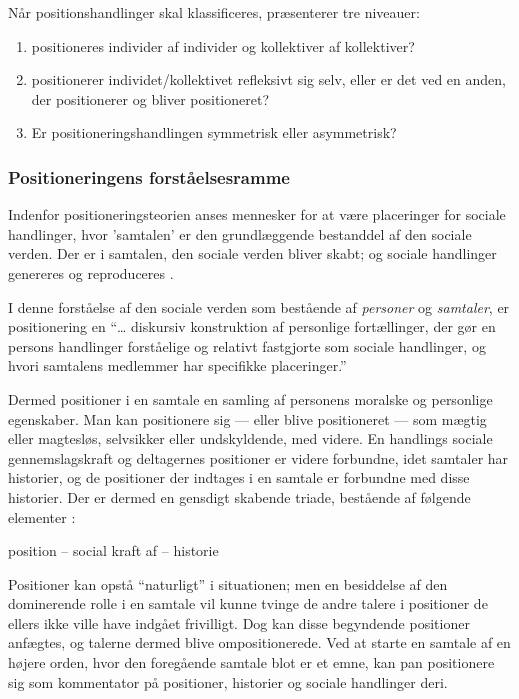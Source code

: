 Når positionshandlinger skal klassificeres, præsenterer 
\citeauthor{harreromPositioningTheoryMoral1999} tre niveauer:
\begin{enumerate}
    \item
        positioneres individer af individer og kollektiver af 
        kollektiver?
    \item
        positionerer individet/kollektivet refleksivt sig selv, 
        eller er det ved en anden, der positionerer og bliver 
        positioneret?
    \item
        Er positioneringshandlingen symmetrisk eller asymmetrisk?
\end{enumerate}

\subsubsection{Positioneringens forståelsesramme}

Indenfor positioneringsteorien anses mennesker for at være 
placeringer for sociale handlinger, hvor 'samtalen' er den 
grundlæggende bestanddel af den sociale verden. Der er i samtalen, 
den sociale verden bliver skabt; og sociale handlinger genereres 
og reproduceres \autocite[s. 
15]{harreromPositioningTheoryMoral1999}.

I denne forståelse af den sociale verden som bestående af 
\emph{personer} og \emph{samtaler}, er positionering en “\ldots 
diskursiv konstruktion af personlige fortællinger, der gør en 
persons handlinger forståelige og relativt fastgjorte som sociale 
handlinger, og hvori samtalens medlemmer har specifikke 
placeringer.” \autocite[s. 16]{harreromPositioningTheoryMoral1999}

Dermed positioner i en samtale en samling af personens moralske og 
personlige egenskaber. Man kan positionere sig — eller blive 
positioneret — som mægtig eller magtesløs, selvsikker eller 
undskyldende, med videre. En handlings sociale gennemslagskraft og 
deltagernes positioner er videre forbundne, idet samtaler har 
historier, og de positioner der indtages i en samtale er forbundne 
med disse historier. Der er dermed en gensdigt skabende triade, 
bestående af følgende elementer \autocite[s.  
17-18]{harreromPositioningTheoryMoral1999}:

position -- social kraft af -- historie

Positioner kan opstå “naturligt” i situationen; men en besiddelse 
af den dominerende rolle i en samtale vil kunne tvinge de andre 
talere i positioner de ellers ikke ville  have indgået frivilligt.  
Dog kan disse begyndende positioner anfægtes, og talerne dermed 
blive ompositionerede. Ved at starte en samtale af en højere 
orden, hvor den foregående samtale blot er et emne, kan pan 
positionere sig som kommentator på positioner, historier og 
sociale handlinger deri.

